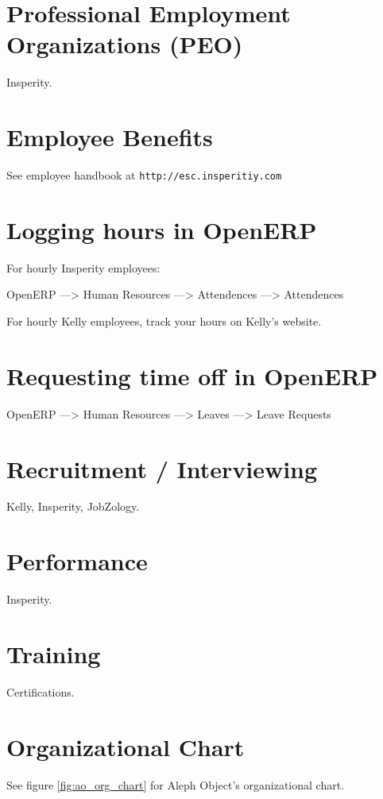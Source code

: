 %
%
%
%
%

\section{Professional Employment Organizations (PEO)}
Insperity.

\section{Employee Benefits}
See employee handbook at \texttt{http://esc.insperitiy.com}

\section{Logging hours in OpenERP}
For hourly Insperity employees:

OpenERP ---> Human Resources ---> Attendences ---> Attendences

For hourly Kelly employees, track your hours on Kelly's website.

\section{Requesting time off in OpenERP}
OpenERP ---> Human Resources ---> Leaves ---> Leave Requests

\section{Recruitment / Interviewing}
Kelly, Insperity, JobZology.

\section{Performance}
Insperity.

\section{Training}
Certifications.

\section{Organizational Chart}
See figure \ref{fig:ao_org_chart} for Aleph Object's organizational chart.


